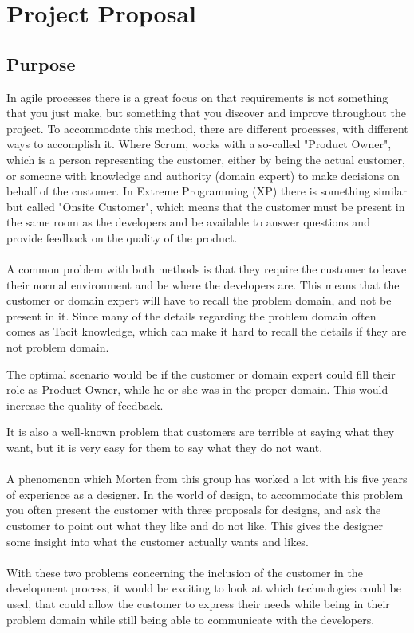\section{Project Proposal}
\subsection{Purpose}
In agile processes there is a great focus on that requirements is not something that you just make, but something that you discover and improve throughout the project.
To accommodate this method, there are different processes, with different ways to accomplish it. 
Where Scrum, works with a so-called "Product Owner", which is a person representing the customer, either by being the actual customer, or someone with knowledge and authority (domain expert) to make decisions on behalf of the customer. 
In Extreme Programming (XP) there is something similar but called "Onsite Customer", which means that the customer must be present in the same room as the developers and be available to answer questions and provide feedback on the quality of the product. 
\\\\
A common problem with both methods is that they require the customer to leave their normal environment and be where the developers are. 
This means that the customer or domain expert will have to recall the problem domain, and not be present in it.
Since many of the details regarding the problem domain often comes as Tacit knowledge, which can make it hard to recall the details if they are not problem domain. 

The optimal scenario would be if the customer or domain expert could fill their role as Product Owner, while he or she was in the proper domain. 
This would increase the quality of feedback.

It is also a well-known problem that customers are terrible at saying what they want, but it is very easy for them to say what they do not want.
\\\\
A phenomenon which Morten from this group has worked a lot with his five years of experience as a designer.
In the world of design, to accommodate this problem you often present the customer with three proposals for designs, and ask the customer to point out what they like and do not like.
This gives the designer some insight into what the customer actually wants and likes. 
\\\\
With these two problems concerning the inclusion of the customer in the development process, it would be exciting to look at which technologies could be used, that could allow the customer to express their needs while being in their problem domain while still being able to communicate with the developers. 

